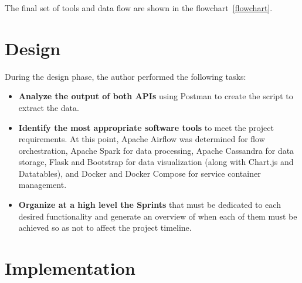 \nonzeroparskip The final set of tools and data flow are shown in the flowchart~\ref{flowchart}. 

\section{Design}

\nonzeroparskip During the design phase, the author performed the following tasks:
\begin{itemize}
	\item \textbf{Analyze the output of both APIs} using Postman to create the script to extract the data.
	\item \textbf{Identify the most appropriate software tools} to meet the project requirements. At this point, Apache Airflow was determined for flow orchestration, Apache Spark for data processing, Apache Cassandra for data storage, Flask and Bootstrap for data visualization (along with Chart.js and Datatables), and Docker and Docker Compose for service container management.
	\item \textbf{Organize at a high level the Sprints} that must be dedicated to each desired functionality and generate an overview of when each of them must be achieved so as not to affect the project timeline.
\end{itemize}

\section{Implementation}

